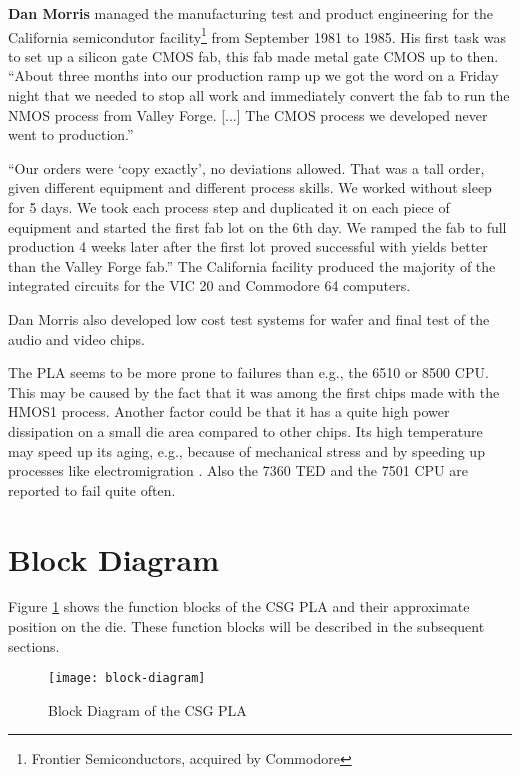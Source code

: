 \begin{mytextframe}{.9\textwidth} \textbf{Dan Morris} managed the
manufacturing test and product engineering for the California semicondutor
facility\footnote{Frontier Semiconductors, acquired by Commodore} from
September 1981 to 1985. His first task was to set up a silicon gate CMOS
fab, this fab made metal gate CMOS up to then. ``About three months into our
production ramp up we got the word on a Friday night that we needed to stop
all work and immediately convert the fab to run the NMOS process from Valley
Forge. [...] The CMOS process we developed never went to production.''

``Our orders were `copy exactly', no deviations allowed. That was a tall
order, given different equipment and different process skills. We worked
without sleep for 5 days. We took each process step and duplicated it on
each piece of equipment and started the first fab lot on the 6th day. We
ramped the fab to full production 4 weeks later after the first lot proved
successful with yields better than the Valley Forge fab.'' The California
facility produced the majority of the integrated circuits for the VIC 20 and
Commodore 64 computers.

Dan Morris also developed low cost test systems for wafer and final test
of the audio and video chips.
\end{mytextframe}

The PLA seems to be more prone to failures than e.g., the 6510 or 8500 CPU.
This may be caused by the fact that it was among the first chips made with
the HMOS1 process. Another factor could be that it has a quite high power
dissipation on a small die area compared to other chips. Its high
temperature may speed up its aging, e.g., because of mechanical stress and
by speeding up processes like electromigration \cite{Hoffmann06}. Also the
7360 TED and the 7501 CPU are reported to fail quite often.

\section{Block Diagram}

Figure \ref{fig:pla-block-dia} shows the function blocks of the CSG PLA
and their approximate position on the die. These function blocks will be
described in the subsequent sections.

\begin{figure}
    \centering
    \texttt{[image: block-diagram]}
    \caption{Block Diagram of the CSG PLA}
    \label{fig:pla-block-dia}
\end{figure}


